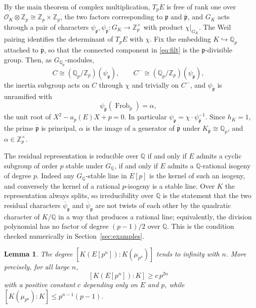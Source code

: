 \documentclass[11pt]{article}
\newtheorem{lemma}[theorem]{Lemma}
\theoremstyle{definition}
\theoremstyle{remark}
\newcommand{\Z}{\mathbb{Z}}
\newcommand{\Q}{\mathbb{Q}}
\newcommand{\Frob}{\operatorname{Frob}}
\newcommand{\pp}{\mathfrak{p}}
\newcommand{\ppb}{\overline{\mathfrak{p}}}
\newcommand{\cO}{\mathcal{O}}
\begin{document}
By the main theorem of complex multiplication, \(T_pE\) is free of rank one over \(\cO_K\otimes\Z_p\cong\Z_p\times\Z_p\), the two factors corresponding to \(\pp\) and \(\ppb\), and \(G_K\) acts through a pair of characters \(\psi_{\pp},\psi_{\ppb}:G_K\to\Z_p^\times\) with product \(\chi|_{G_K}\). The Weil pairing identifies the determinant of \(T_pE\) with \(\chi\). Fix the embedding \(K\hookrightarrow\Q_p\) attached to \(\ppb\), so that the connected component in \eqref{eq:filt} is the \(\pp\)-divisible group. Then, as \(G_{\Q_p}\)-modules,
\begin{equation}
\label{eq:chars}
C\cong (\Q_p/\Z_p)(\psi_{\pp}),\qquad
C^-\cong (\Q_p/\Z_p)(\psi_{\ppb}),
\end{equation}
the inertia subgroup acts on \(C\) through \(\chi\) and trivially on \(C^-\), and \(\psi_{\ppb}\) is unramified with
\begin{equation}
\label{eq:alpha}
\psi_{\ppb}(\Frob_p)=\alpha,
\end{equation}
the unit root of \(X^2-a_p(E)X+p=0\). In particular \(\psi_{\pp}=\chi\cdot\psi_{\ppb}^{-1}\). Since \(h_K=1\), the prime \(\ppb\) is principal, \(\alpha\) is the image of a generator of \(\ppb\) under \(K_{\ppb}\cong\Q_p\), and \(\alpha\in\Z_p^\times\).

The residual representation is reducible over \(\Q\) if and only if \(E\) admits a cyclic subgroup of order \(p\) stable under \(G_\Q\), if and only if \(E\) admits a \(\Q\)-rational isogeny of degree \(p\). Indeed any \(G_\Q\)-stable line in \(E[p]\) is the kernel of such an isogeny, and conversely the kernel of a rational \(p\)-isogeny is a stable line. Over \(K\) the representation always splits, so irreducibility over \(\Q\) is the statement that the two residual characters \(\overline{\psi}_{\pp}\) and \(\overline{\psi}_{\ppb}\) are not twists of each other by the quadratic character of \(K/\Q\) in a way that produces a rational line; equivalently, the division polynomial has no factor of degree \((p-1)/2\) over \(\Q\). This is the condition checked numerically in Section~\ref{sec:examples}.

\begin{lemma}
\label{lem:rayclass}
The degree \([K(E[p^n]):K(\mu_{p^n})]\) tends to infinity with \(n\). More precisely, for all large \(n\),
\[
[K(E[p^n]):K]
\ge
c\, p^{2n}
\]
with a positive constant \(c\) depending only on \(E\) and \(p\), while \([K(\mu_{p^n}):K]\le p^{n-1}(p-1)\).
\end{lemma}
\end{document}
